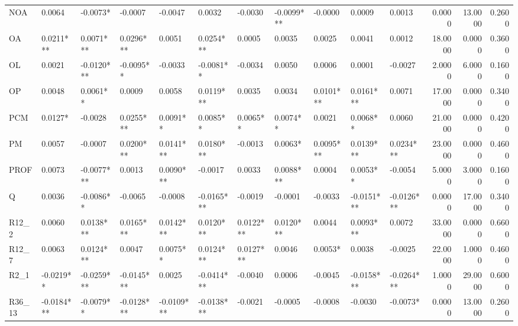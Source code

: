 \begin{tabular}{lllllllllllrrr}
NOA     &      0.0064 &    -0.0073* &     -0.0007 &     -0.0047 &      0.0032 &    -0.0030 &  -0.0099*** &    -0.0000 &      0.0009 &      0.0013 &   0.0000 &  13.0000 &   0.2600 \\
OA      &   0.0211*** &   0.0071*** &   0.0296*** &      0.0051 &   0.0254*** &     0.0005 &      0.0035 &     0.0025 &      0.0041 &      0.0012 &  18.0000 &   0.0000 &   0.3600 \\
OL      &      0.0021 &  -0.0120*** &   -0.0095** &     -0.0033 &   -0.0081** &    -0.0034 &      0.0050 &     0.0006 &      0.0001 &     -0.0027 &   2.0000 &   6.0000 &   0.1600 \\
OP      &      0.0048 &    0.0061** &      0.0009 &      0.0058 &   0.0119*** &     0.0035 &      0.0034 &  0.0101*** &   0.0161*** &      0.0071 &  17.0000 &   0.0000 &   0.3400 \\
PCM     &     0.0127* &     -0.0028 &   0.0255*** &    0.0091** &    0.0085** &   0.0065** &    0.0074** &     0.0021 &    0.0068** &      0.0060 &  21.0000 &   0.0000 &   0.4200 \\
PM      &      0.0057 &     -0.0007 &   0.0200*** &   0.0141*** &   0.0180*** &    -0.0013 &     0.0063* &  0.0095*** &   0.0139*** &   0.0234*** &  23.0000 &   0.0000 &   0.4600 \\
PROF    &      0.0073 &  -0.0077*** &      0.0013 &   0.0090*** &     -0.0017 &     0.0033 &   0.0088*** &     0.0004 &    0.0053** &     -0.0054 &   5.0000 &   3.0000 &   0.1600 \\
Q       &      0.0036 &   -0.0086** &     -0.0065 &     -0.0008 &  -0.0165*** &    -0.0019 &     -0.0001 &    -0.0033 &  -0.0151*** &  -0.0126*** &   0.0000 &  17.0000 &   0.3400 \\
R12\_2   &      0.0060 &   0.0138*** &   0.0165*** &   0.0142*** &   0.0120*** &  0.0122*** &   0.0120*** &     0.0044 &   0.0093*** &      0.0072 &  33.0000 &   0.0000 &   0.6600 \\
R12\_7   &      0.0063 &   0.0124*** &      0.0047 &    0.0075** &   0.0124*** &  0.0127*** &      0.0046 &    0.0053* &      0.0038 &     -0.0025 &  22.0000 &   1.0000 &   0.4600 \\
R2\_1    &   -0.0219** &  -0.0259*** &  -0.0145*** &      0.0025 &  -0.0414*** &    -0.0040 &      0.0006 &    -0.0045 &  -0.0158*** &  -0.0264*** &   1.0000 &  29.0000 &   0.6000 \\
R36\_13  &  -0.0184*** &   -0.0079** &  -0.0128*** &  -0.0109*** &  -0.0138*** &    -0.0021 &     -0.0005 &    -0.0008 &     -0.0030 &    -0.0073* &   0.0000 &  13.0000 &   0.2600 \\

\end{tabular}
